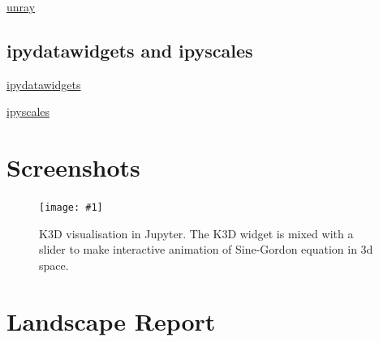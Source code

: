 \documentclass{deliverablereport}
\begin{document}
\href{https://github.com/vidartf/unray}{unray}

\subsection{ipydatawidgets and ipyscales}

\href{https://github.com/vidartf/ipydatawidgets}{ipydatawidgets}

\href{https://github.com/vidartf/ipyscales}{ipyscales}




\clearpage
\appendix
\section{Screenshots}\label{screenshots}

\newcommand{\screenshot}[2]{
\begin{figure}[ht]
  \texttt{[image: \#1]}
  \caption{#2}
\end{figure}}


\screenshot{k3d_3.png}{K3D visualisation in Jupyter. The K3D widget is
  mixed with a slider to make interactive animation of Sine-Gordon
  equation in 3d space.}

\clearpage
\section{Landscape Report}\label{landscape}

\end{document}
